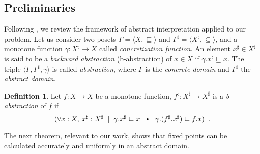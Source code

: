 \documentclass{eptcs}
\theoremstyle{plain}
\theoremstyle{definition}
\newtheorem{definition}[theorem]{Definition}
\newcommand{\totype}{\ensuremath{\ra}}
\newcommand{\ra}{\ensuremath{\rightarrow}}
\newcommand{\dotsep}{\mbox{\raisebox{0.4ex}{\tiny\ensuremath{\:\;\bullet\;\:}}}}
\newcommand{\slq}{\ensuremath{\sqsubseteq}}
\newcommand{\slqn}{\subseteq}
\newcommand{\noi}[0]{\noindent}
\begin{document}
\subsection{Preliminaries}


Following \cite{monniaux00}, we review the framework of abstract interpretation
applied to our problem.  Let us consider two posets $\Gamma = \langle X, \slq
\rangle$ and $\Gamma^\sharp = \langle X^\sharp, \slqn \rangle$, and a monotone
function $\gamma : X^\sharp \totype X$ called \emph{concretization function}. An
element $x^\sharp \in X^\sharp$ is said to be a \emph{backward abstraction}
(\mbox{b-abstraction}) of $x \in X$ if $\gamma.x^\sharp \slq x$. The triple
$\langle \Gamma, \Gamma^\sharp, \gamma \rangle$ is called
\emph{abstraction}, where $\Gamma$ is the \emph{concrete domain} and
$\Gamma^\sharp$ the \emph{abstract domain}.

\begin{definition} \label{def:b-abstraction_of}
Let $f : X \totype X$ be a monotone function, $f^\sharp
: X^\sharp \totype X^\sharp$ is a \emph{\mbox{b-abstraction}} of $f$ if
\[
( \forall x : X,\: x^\sharp : X^\sharp \;\;|\;\; 
  \gamma.x^\sharp \slq x 
  \;\:\dotsep\:\;
  \gamma.(f^\sharp.x^\sharp) \slq f.x
)\enspace.
\]
\end{definition}



\noi The next theorem, relevant to our work, shows that fixed points can be
calculated accurately and uniformly in an abstract domain.  
 
\end{document}
